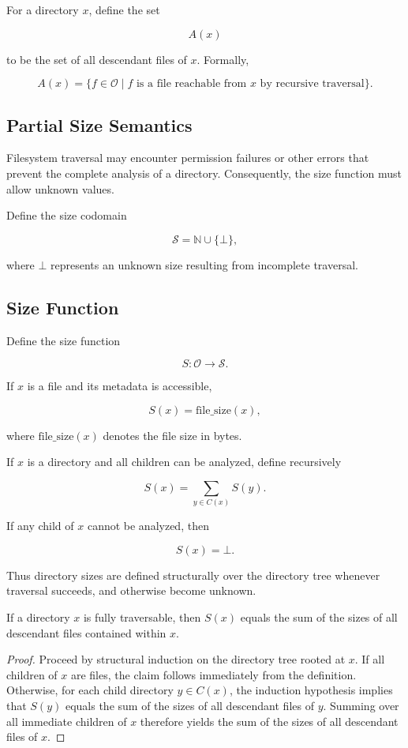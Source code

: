 For a directory \(x\), define the set

\[
A(x)
\]

to be the set of all descendant files of \(x\). Formally,

\[
A(x) = \{f \in \mathcal{O} \mid f \text{ is a file reachable from } x \text{ by recursive traversal}\}.
\]

\subsection{Partial Size Semantics}

Filesystem traversal may encounter permission failures or other errors that prevent the complete analysis of a directory. Consequently, the size function must allow unknown values.

Define the size codomain

\[
\mathcal{S} = \mathbb{N} \cup \{\bot\},
\]

where \(\bot\) represents an unknown size resulting from incomplete traversal.

\subsection{Size Function}

Define the size function

\[
S : \mathcal{O} \rightarrow \mathcal{S}.
\]

If \(x\) is a file and its metadata is accessible,

\[
S(x) = \mathrm{file\_size}(x),
\]

where \(\mathrm{file\_size}(x)\) denotes the file size in bytes.

If \(x\) is a directory and all children can be analyzed, define recursively

\[
S(x) = \sum_{y \in C(x)} S(y).
\]

If any child of \(x\) cannot be analyzed, then

\[
S(x) = \bot.
\]

Thus directory sizes are defined structurally over the directory tree whenever traversal succeeds, and otherwise become unknown.

\begin{proposition}
If a directory \(x\) is fully traversable, then \(S(x)\) equals the sum of the sizes of all descendant files contained within \(x\).
\end{proposition}

\begin{proof}
Proceed by structural induction on the directory tree rooted at \(x\). If all children of \(x\) are files, the claim follows immediately from the definition. Otherwise, for each child directory \(y \in C(x)\), the induction hypothesis implies that \(S(y)\) equals the sum of the sizes of all descendant files of \(y\). Summing over all immediate children of \(x\) therefore yields the sum of the sizes of all descendant files of \(x\).
\end{proof}

